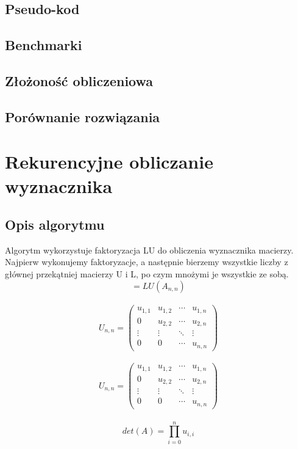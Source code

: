 \documentclass{article}
\begin{document}
\subsection{Pseudo-kod}
\subsection{Benchmarki}
\subsection{Złożoność obliczeniowa}
\subsection{Porównanie rozwiązania}

\section{Rekurencyjne obliczanie wyznacznika}

\subsection{Opis algorytmu}
\qquad Algorytm wykorzystuje faktoryzacja LU do obliczenia wyznacznika macierzy. Najpierw wykonujemy faktoryzacje, a następnie bierzemy wszystkie liczby z głównej przekątniej macierzy U i L, po czym mnożymi je wszystkie ze sobą. \\
\begin{equation}
[ L_{n,n}, U_{n,n} ] = LU(A_{n,n})
\end{equation}\\
\begin{equation}
U_{n,n} = 
 \begin{pmatrix}
  u_{1,1} & u_{1,2} & \cdots & u_{1,n} \\
  0 & u_{2,2} & \cdots & u_{2,n} \\
  \vdots  & \vdots  & \ddots & \vdots  \\
  0 & 0 & \cdots & u_{n,n} 
 \end{pmatrix}
\end{equation}\\
\begin{equation}
U_{n,n} = 
 \begin{pmatrix}
  u_{1,1} & u_{1,2} & \cdots & u_{1,n} \\
  0 & u_{2,2} & \cdots & u_{2,n} \\
  \vdots  & \vdots  & \ddots & \vdots  \\
  0 & 0 & \cdots & u_{n,n} 
 \end{pmatrix}
\end{equation}\\
\begin{equation}
det(A) = \prod_{i = 0}^{n} u_{i, i}
\end{equation}
\end{document}
